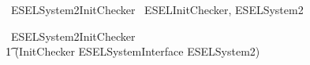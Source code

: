 \begin{zsection}
	\SECTION\ ESELSystem2InitChecker \parents\ ESELInitChecker, ESELSystem2
\end{zsection}

\begin{circus}
    \circprocess\ ESELSystem2InitChecker \circdef \\
        \t1 (InitChecker \lpar ESELSystemInterface \rpar ESELSystem2) \\
\end{circus}
